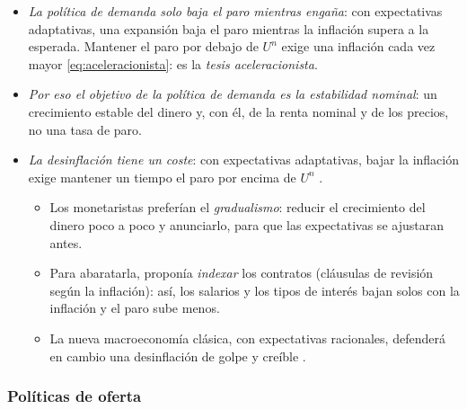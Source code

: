 \documentclass[11pt]{article}
\begin{document}
\begin{itemize}
\item \emph{La política de demanda solo baja el paro mientras engaña}: con expectativas adaptativas, una expansión baja el paro mientras la inflación supera a la esperada. Mantener el paro por debajo de $U^n$ exige una inflación cada vez mayor \eqref{eq:aceleracionista}: es la \emph{tesis aceleracionista}.
\item \emph{Por eso el objetivo de la política de demanda es la estabilidad nominal}: un crecimiento estable del dinero y, con él, de la renta nominal y de los precios, no una tasa de paro.
\item \emph{La desinflación tiene un coste}: con expectativas adaptativas, bajar la inflación exige mantener un tiempo el paro por encima de $U^n$ .
  \begin{itemize}
  \item Los monetaristas preferían el \emph{gradualismo}: reducir el crecimiento del dinero poco a poco y anunciarlo, para que las expectativas se ajustaran antes.
  \item Para abaratarla, \textcite{Friedman1974Monetary} proponía \emph{indexar} los contratos (cláusulas de revisión según la inflación): así, los salarios y los tipos de interés bajan solos con la inflación y el paro sube menos.
  \item La nueva macroeconomía clásica, con expectativas racionales, defenderá en cambio una desinflación de golpe y creíble .
  \end{itemize}
\end{itemize}

\subsubsection{Políticas de oferta}\label{sec:politica-oferta}
\end{document}
